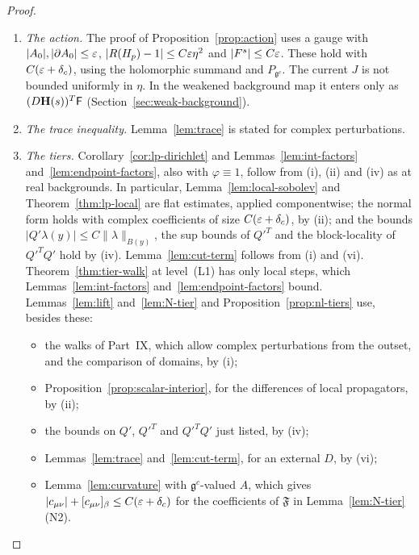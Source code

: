 \begin{proof}
\begin{enumerate}[label=(\roman*)]
\item \emph{The action.} The proof of Proposition~\ref{prop:action} uses a gauge with $|A_0|,|\partial A_0|\le\varepsilon$, $|R(H_p)-1|\le C\varepsilon\eta^2$ and $|F^s|\le C\varepsilon$. These hold with $C(\varepsilon+\delta_c)$, using the holomorphic summand and $P_{\mathfrak g^c}$. The current $J$ is not bounded uniformly in $\eta$. In the weakened background map it enters only as $(D\mathbf H(s))^T\mathsf F$ (Section~\ref{sec:weak-background}).
\item \emph{The trace inequality.} Lemma~\ref{lem:trace} is stated for complex perturbations.
\item \emph{The tiers.} Corollary~\ref{cor:lp-dirichlet} and Lemmas~\ref{lem:int-factors} and~\ref{lem:endpoint-factors}, also with $\varphi\equiv1$, follow from (i), (ii) and (iv) as at real backgrounds. In particular, Lemma~\ref{lem:local-sobolev} and Theorem~\ref{thm:lp-local} are flat estimates, applied componentwise; the normal form holds with complex coefficients of size $C(\varepsilon+\delta_c)$, by (ii); and the bounds $|Q'\lambda(y)|\le C\|\lambda\|_{B(y)}$, the sup bounds of $Q'^T$ and the block-locality of $Q'^TQ'$ hold by (iv). Lemma~\ref{lem:cut-term} follows from (i) and (vi). Theorem~\ref{thm:tier-walk} at level~(L1) has only local steps, which Lemmas~\ref{lem:int-factors} and~\ref{lem:endpoint-factors} bound. Lemmas~\ref{lem:lift} and~\ref{lem:N-tier} and Proposition~\ref{prop:nl-tiers} use, besides these:
  \begin{itemize}
  \item the walks of Part~IX, which allow complex perturbations from the outset, and the comparison of domains, by (i);
  \item Proposition~\ref{prop:scalar-interior}, for the differences of local propagators, by (ii);
  \item the bounds on $Q'$, $Q'^T$ and $Q'^TQ'$ just listed, by (iv);
  \item Lemmas~\ref{lem:trace} and~\ref{lem:cut-term}, for an external $D$, by (vi);
  \item Lemma~\ref{lem:curvature} with $\mathfrak g^c$-valued $A$, which gives $|c_{\mu\nu}|+[c_{\mu\nu}]_\beta\le C(\varepsilon+\delta_c)$ for the coefficients of $\mathfrak F$ in Lemma~\ref{lem:N-tier}(N2).
  \end{itemize}

\end{enumerate}
\end{proof}
